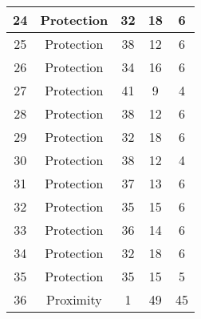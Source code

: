 \documentclass[results.tex]{subfiles}
\begin{document}
\begin{center}
\begin{tabular}{| c || c | c | c | c |}
            \hline
            24                      & Protection                   & 32                     & 18                      & 6                    \\
            \hline
            25                      & Protection                   & 38                     & 12                      & 6                    \\
            \hline
            26                      & Protection                   & 34                     & 16                      & 6                    \\
            \hline
            27                      & Protection                   & 41                     & 9                       & 4                    \\
            \hline
            28                      & Protection                   & 38                     & 12                      & 6                    \\
            \hline
            29                      & Protection                   & 32                     & 18                      & 6                    \\
            \hline
            30                      & Protection                   & 38                     & 12                      & 4                    \\
            \hline
            31                      & Protection                   & 37                     & 13                      & 6                    \\
            \hline
            32                      & Protection                   & 35                     & 15                      & 6                    \\
            \hline
            33                      & Protection                   & 36                     & 14                      & 6                    \\
            \hline
            34                      & Protection                   & 32                     & 18                      & 6                    \\
            \hline
            35                      & Protection                   & 35                     & 15                      & 5                    \\
            \hline
            36                      & Proximity                    & 1                      & 49                      & 45                   \\

\end{tabular}
\end{center}
\end{document}

